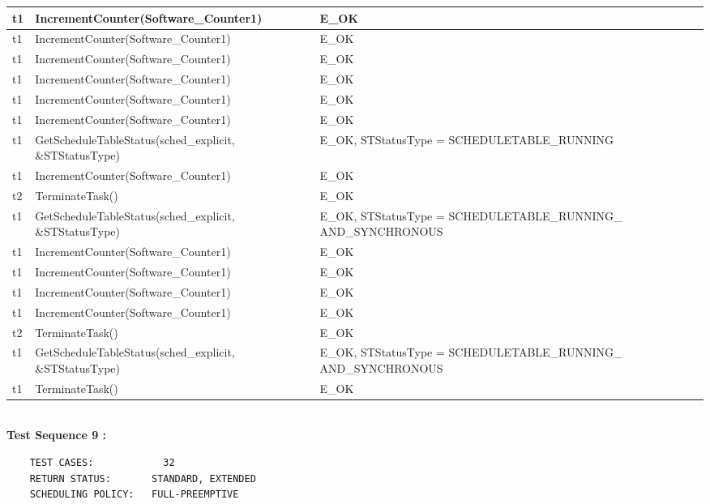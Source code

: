 \documentclass[10pt]{article}
\newlength{\Li}\settowidth{\Li}{Running}
\newlength{\Lii}\setlength{\Lii}{7cm}
\newlength{\Liiii}\setlength{\Liiii}{0.9cm}
\newlength{\Liii}\setlength{\Liii}{\textwidth} \addtolength{\Liii}{-\Li} \addtolength{\Liii}{-\Lii} \addtolength{\Liii}{-\Liiii}
\begin{document}
\begin{supertabular}{|p{\Li}|p{\Lii}|p{\Liii}|p{\Liiii}|}
	t1		& IncrementCounter(Software\_Counter1)						& E\_OK																	& \\ \hline
	t1		& IncrementCounter(Software\_Counter1)						& E\_OK																	& \\ \hline
	t1		& IncrementCounter(Software\_Counter1)						& E\_OK																	& \\ \hline
	t1		& IncrementCounter(Software\_Counter1)						& E\_OK																	& \\ \hline
	t1		& IncrementCounter(Software\_Counter1)						& E\_OK																	& \\ \hline
	t1		& IncrementCounter(Software\_Counter1)						& E\_OK																	& \\ \hline
	t1		& GetScheduleTableStatus(sched\_explicit, \&STStatusType)			& E\_OK, STStatusType = SCHEDULETABLE\_RUNNING 							& \\ \hline
	t1		& IncrementCounter(Software\_Counter1)						& E\_OK																	& \\ \hline
	t2		& TerminateTask()											& E\_OK																	& \\ \hline
	t1		& GetScheduleTableStatus(sched\_explicit, \&STStatusType)			& E\_OK, STStatusType = SCHEDULETABLE\_RUNNING\_ AND\_SYNCHRONOUS		& \\ \hline
	t1		& IncrementCounter(Software\_Counter1)						& E\_OK																	& \\ \hline
	t1		& IncrementCounter(Software\_Counter1)						& E\_OK																	& \\ \hline
	t1		& IncrementCounter(Software\_Counter1)						& E\_OK																	& \\ \hline
	t1		& IncrementCounter(Software\_Counter1)						& E\_OK																	& \\ \hline
	t2		& TerminateTask()											& E\_OK																	& \\ \hline
	t1		& GetScheduleTableStatus(sched\_explicit, \&STStatusType)			& E\_OK, STStatusType = SCHEDULETABLE\_RUNNING\_ AND\_SYNCHRONOUS		& \\ \hline
	t1		& TerminateTask()											& E\_OK																	& \\ \hline
	\end{supertabular}\\
	
	\textbf{Test Sequence 9 :}
	\begin{lstlisting}
	TEST CASES:		       32
	RETURN STATUS:	  	 STANDARD, EXTENDED
	SCHEDULING POLICY:   FULL-PREEMPTIVE
	\end{lstlisting}
	
	
\end{document}
